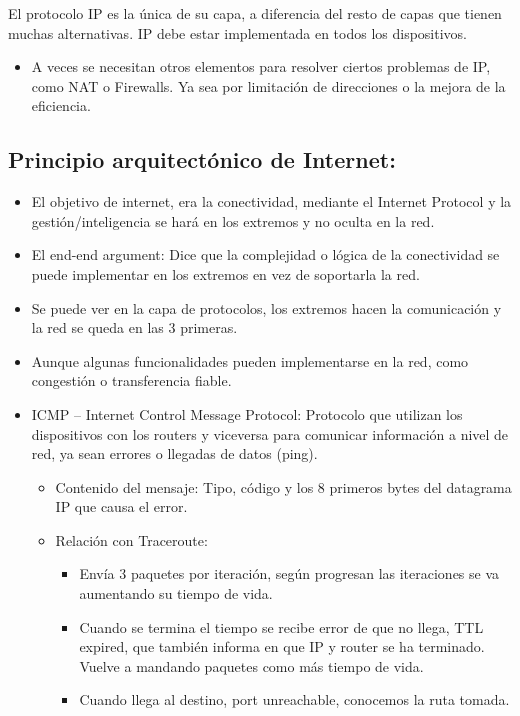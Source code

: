 \documentclass[12pt, twoside, openright]{report} %
\begin{document}
El protocolo IP es la única de su capa, a diferencia del resto de
capas que tienen muchas alternativas. IP debe estar implementada en
todos los dispositivos.
\begin{itemize}
	\item A veces se necesitan otros elementos para resolver ciertos problemas
	      de IP, como NAT o Firewalls. Ya sea por limitación de direcciones o
	      la mejora de la eficiencia.
\end{itemize}

\subsection{Principio arquitectónico de Internet:}

\begin{itemize}
	\item El objetivo de internet, era la conectividad, mediante el Internet
	      Protocol y la gestión/inteligencia se hará en los extremos y no
	      oculta en la red.
	\item El end-end argument: Dice que la complejidad o lógica de la
	      conectividad se puede implementar en los extremos en vez de
	      soportarla la red.
	\item Se puede ver en la capa de protocolos, los extremos hacen la
	      comunicación y la red se queda en las 3 primeras.
	\item Aunque algunas funcionalidades pueden implementarse en la red, como
	      congestión o transferencia fiable.
	\item ICMP -- Internet Control Message Protocol: Protocolo que utilizan
	      los dispositivos con los routers y viceversa para comunicar
	      información a nivel de red, ya sean errores o llegadas de datos
	      (ping).

	      \begin{itemize}
		      \item Contenido del mensaje: Tipo, código y los 8 primeros bytes del
		            datagrama IP que causa el error.
		      \item Relación con Traceroute:

		            \begin{itemize}
			            \item Envía 3 paquetes por iteración, según progresan las iteraciones
			                  se va aumentando su tiempo de vida.
			            \item Cuando se termina el tiempo se recibe error de que no llega, TTL
			                  expired, que también informa en que IP y router se ha terminado.
			                  Vuelve a mandando paquetes como más tiempo de vida.
			            \item Cuando llega al destino, port unreachable, conocemos la ruta
			                  tomada.
		            \end{itemize}
	      \end{itemize}
\end{itemize}
\end{document}
